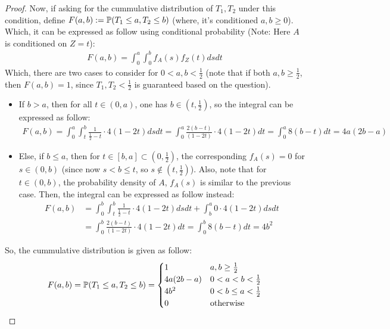 \documentclass{article}
\begin{document}
\begin{proof}
    Now, if asking for the cummulative distribution of $T_1,T_2$ under this condition, define $F(a,b):= \mathbb{P}(T_1\leq a,T_2\leq b)$ (where, it's conditioned $a,b\geq 0$). Which, it can be expressed as follow using conditional probability (Note: Here $A$ is conditioned on $Z=t$):
    \begin{align}
        F(a,b)=\int_{0}^{a}\int_{0}^{b}f_A(s)f_Z(t)dsdt
    \end{align}
    Which, there are two cases to consider for $0< a,b< \frac{1}{2}$ (note that if both $a,b\geq \frac{1}{2}$, then $F(a,b)=1$, since $T_1,T_2<\frac{1}{2}$ is guaranteed based on the question).
    \begin{itemize}
        \item If $b>a$, then for all $t\in (0,a)$, one has $b\in (t,\frac{1}{2})$, so the integral can be expressed as follow:
        \begin{align}
            F(a,b)=\int_{0}^{a}\int_{t}^{b}\frac{1}{\frac{1}{2}-t}\cdot 4(1-2t)dsdt = \int_{0}^{a}\frac{2(b-t)}{(1-2t)}\cdot 4(1-2t)dt = \int_{0}^{a}8(b-t)dt = 4a(2b-a)
        \end{align}
        \item Else, if $b\leq a$, then for $t\in [b,a] \subset (0,\frac{1}{2})$, the corresponding $f_A(s) = 0$ for $s\in (0,b)$ (since now $s<b\leq t$, so $s\notin (t,\frac{1}{2})$). Also, note that for $t\in (0,b)$, the probability density of $A$, $f_A(s)$ is similar to the previous case. Then, the integral can be expressed as follow instead:
        \begin{align}
            F(a,b) &= \int_{0}^{b}\int_{t}^{b}\frac{1}{\frac{1}{2}-t}\cdot 4(1-2t)dsdt + \int_{b}^{a}0\cdot 4(1-2t)dsdt\\
            &= \int_{0}^{b}\frac{2(b-t)}{(1-2t)}\cdot 4(1-2t)dt = \int_{0}^{b}8(b-t)dt = 4b^2
        \end{align}
    \end{itemize}
    So, the cummulative distribution is given as follow:
    \begin{align}
        F(a,b) = \mathbb{P}(T_1\leq a,T_2\leq b) = \begin{cases}
            1 & a,b\geq \frac{1}{2}\\
            4a(2b-a) & 0<a<b<\frac{1}{2}\\
            4b^2 & 0<b\leq a<\frac{1}{2}\\
            0 & \text{otherwise}
        \end{cases}
    \end{align}
\end{proof}
\end{document}
